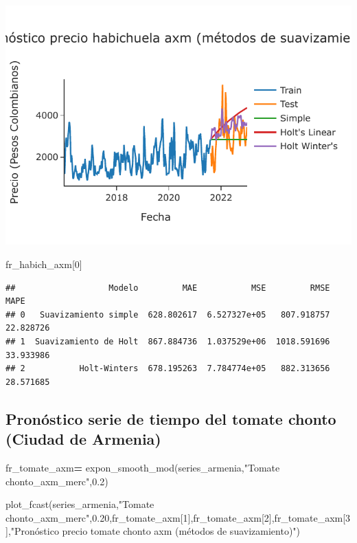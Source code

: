 \documentclass[
]{book}
\newenvironment{Shaded}{\begin{snugshade}}{\end{snugshade}}
\newcommand{\DecValTok}[1]{\textcolor[rgb]{0.00,0.00,0.81}{#1}}
\newcommand{\FloatTok}[1]{\textcolor[rgb]{0.00,0.00,0.81}{#1}}
\newcommand{\NormalTok}[1]{#1}
\newcommand{\OperatorTok}[1]{\textcolor[rgb]{0.81,0.36,0.00}{\textbf{#1}}}
\newcommand{\StringTok}[1]{\textcolor[rgb]{0.31,0.60,0.02}{#1}}
\begin{document}
\includegraphics{bookdown-demo_files/figure-latex/unnamed-chunk-136-123.pdf}

\begin{Shaded}
\begin{Highlighting}[]

\NormalTok{fr\_habich\_axm[}\DecValTok{0}\NormalTok{]}
\end{Highlighting}
\end{Shaded}

\begin{verbatim}
##                   Modelo         MAE           MSE         RMSE       MAPE
## 0   Suavizamiento simple  628.802617  6.527327e+05   807.918757  22.828726
## 1  Suavizamiento de Holt  867.884736  1.037529e+06  1018.591696  33.933986
## 2           Holt-Winters  678.195263  7.784774e+05   882.313656  28.571685
\end{verbatim}

\hypertarget{pronuxf3stico-serie-de-tiempo-del-tomate-chonto-ciudad-de-armenia}{%
\subsection{Pronóstico serie de tiempo del tomate chonto (Ciudad de Armenia)}\label{pronuxf3stico-serie-de-tiempo-del-tomate-chonto-ciudad-de-armenia}}

\begin{Shaded}
\begin{Highlighting}[]

\NormalTok{fr\_tomate\_axm}\OperatorTok{=}\NormalTok{ expon\_smooth\_mod(series\_armenia,}\StringTok{"Tomate chonto\_axm\_merc"}\NormalTok{,}\FloatTok{0.2}\NormalTok{)}

\NormalTok{plot\_fcast(series\_armenia,}\StringTok{"Tomate chonto\_axm\_merc"}\NormalTok{,}\FloatTok{0.20}\NormalTok{,fr\_tomate\_axm[}\DecValTok{1}\NormalTok{],fr\_tomate\_axm[}\DecValTok{2}\NormalTok{],fr\_tomate\_axm[}\DecValTok{3}\NormalTok{],}\StringTok{"Pronóstico precio tomate chonto axm (métodos de suavizamiento)"}\NormalTok{)}
\end{Highlighting}
\end{Shaded}
\end{document}
